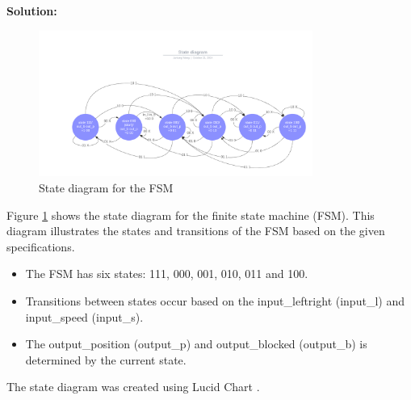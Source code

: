 \textbf{Solution:}

\begin{figure}[h!]
    \centering
    \includegraphics[width=0.8\textwidth]{figures/State diagram.png}
    \caption{State diagram for the FSM}
    \label{fig:state-diagram}
\end{figure}

Figure \ref{fig:state-diagram} shows the state diagram for the finite state machine (FSM). This diagram illustrates the states and transitions of the FSM based on the given specifications.

\begin{itemize}
    \item The FSM has six states: 111, 000, 001, 010, 011 and 100.
    \item Transitions between states occur based on the input\_leftright (input\_l) and input\_speed (input\_s).
    \item The output\_position (output\_p) and output\_blocked (output\_b) is determined by the current state.
\end{itemize}

The state diagram was created using Lucid Chart \cite{lucidchart}.

